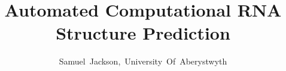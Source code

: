 \documentclass[journal]{IEEEtran}
\begin{document}
%
\title{Automated Computational RNA Structure Prediction}
%
%
%

\author{Samuel~Jackson,~University~Of~Aberystwyth}

% 
%



% 
\end{document}
